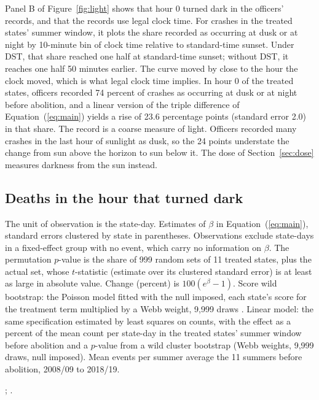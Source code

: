Panel B of Figure~\ref{fig:light} shows that hour 0 turned dark in the officers' records, and that the records use legal clock time. For crashes in the treated states' summer window, it plots the share recorded as occurring at dusk or at night by 10-minute bin of clock time relative to standard-time sunset. Under DST, that share reached one half at standard-time sunset; without DST, it reaches one half 50 minutes earlier. The curve moved by close to the hour the clock moved, which is what legal clock time implies. In hour 0 of the treated states, officers recorded 74 percent of crashes as occurring at dusk or at night before abolition, and a linear version of the triple difference of Equation~(\ref{eq:main}) yields a rise of 23.6 percentage points (standard error 2.0) in that share. %
The record is a coarse measure of light. Officers recorded many crashes in the last hour of sunlight as dusk, so the 24 points understate the change from sun above the horizon to sun below it. The dose of Section~\ref{sec:dose} measures darkness from the sun instead.

\subsection{Deaths in the hour that turned dark}

\begin{table}[tbp]
  \caption{The Hour That Turned Dark and the Hour That Turned Light}
  \label{tab:main}
  \centering\footnotesize
  
  \begin{tablenotes}[Notes]
  The unit of observation is the state-day. Estimates of $\beta$ in Equation~(\ref{eq:main}), standard errors clustered by state in parentheses. Observations exclude state-days in a fixed-effect group with no event, which carry no information on $\beta$. The permutation $p$-value is the share of 999 random sets of 11 treated states, plus the actual set, whose $t$-statistic (estimate over its clustered standard error) is at least as large in absolute value. Change (percent) is $100(e^{\beta}-1)$. Score wild bootstrap: the Poisson model fitted with the null imposed, each state's score for the treatment term multiplied by a Webb weight, 9,999 draws \citep{kline2012score}. Linear model: the same specification estimated by least squares on counts, with the effect as a percent of the mean count per state-day in the treated states' summer window before abolition and a $p$-value from a wild cluster bootstrap (Webb weights, 9,999 draws, null imposed). Mean events per summer average the 11 summers before abolition, 2008/09 to 2018/19.
  \end{tablenotes}
  \begin{tablenotes}[Sources]
  \citet{datasus2025sim}; \citet{prf2025dados}.
  \end{tablenotes}
\end{table}

